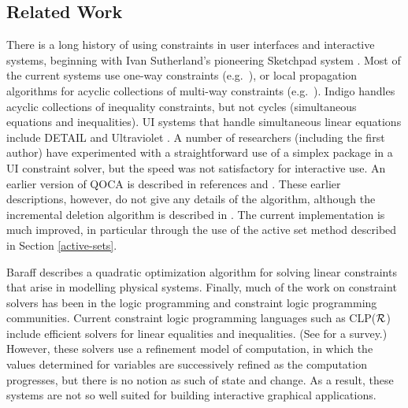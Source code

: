 \documentclass{uist96}
\begin{document}
\subsection{Related Work}

There is a long history of using constraints in user interfaces and
interactive systems, beginning with Ivan Sutherland's pioneering Sketchpad
system \cite{sutherland-ifips-63}.  Most of the current systems use one-way
constraints (e.g.\ \cite{hudson-subarctic-manual,myers-chi-96}), or local
propagation algorithms for acyclic collections of multi-way constraints
(e.g.\ \cite{sannella-spe-93,vander-zanden-toplas-96}).
Indigo \cite{borning-uist-96} handles acyclic collections of inequality
constraints, but not cycles (simultaneous equations and inequalities).  UI
systems that handle simultaneous linear equations include \mbox{DETAIL}
\cite{hosobe-cp-96} and Ultraviolet \cite{borning-cp-95}.  A number of
researchers (including the first author) have experimented with a
straightforward use of a simplex package in a UI constraint solver,
but the speed was not satisfactory for interactive use.
An earlier version of QOCA is described in references \cite{helm-gi-92} and
\cite{helm-eurographics-92}.  These earlier descriptions, however, do not
give any details of the algorithm, although the incremental deletion
algorithm is described in \cite{huynh-marriott-96}.  
The current implementation is
much improved, in particular through the use of the active set method
described in Section \ref{active-sets}.

Baraff \cite{baraff-siggraph-94} describes a quadratic optimization
algorithm for solving linear constraints that arise in modelling physical
systems.  Finally, much of the work on constraint solvers
has been in the logic programming and constraint logic programming
communities.  Current constraint logic programming languages such as
CLP($\cal R$) \cite{jaffar-toplas-92} include efficient solvers for linear
equalities and inequalities.  (See \cite{marriott-stuckey-book} for a
survey.)  However, these solvers use a refinement model of computation, in
which the values determined for variables are successively refined as the
computation progresses, but there is no notion as such of state and change.
As a result, these systems are not so well suited for building interactive
graphical applications.


\pagebreak
\end{document}
